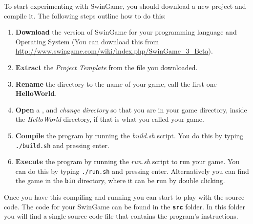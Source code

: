 To start experimenting with SwinGame, you should download a new project and compile it. The following steps outline how to do this:
\begin{enumerate}
  \item \textbf{Download} the version of SwinGame for your programming language and Operating System (You can download this from \url{http://www.swingame.com/wiki/index.php/SwinGame_3_Beta}). 
  \item \textbf{Extract} the \emph{Project Template} from the file you downloaded.
  \item \textbf{Rename} the directory to the name of your game, call the first one \textbf{HelloWorld}.
  \item \textbf{Open} a , and \emph{change directory} so that you are in your game directory, inside the \emph{HelloWorld} directory, if that is what you called your game.
  \item \textbf{Compile} the program by running the \emph{build.sh} script. You do this by typing \texttt{./build.sh} and pressing enter.
  \item \textbf{Execute} the program by running the \emph{run.sh} script to run your game. You can do this by typing \texttt{./run.sh} and pressing enter. Alternatively you can find the game in the \texttt{bin} directory, where it can be run by double clicking.
\end{enumerate}

Once you have this compiling and running you can start to play with the source code. The code for your SwinGame can be found in the \textbf{\texttt{src}} folder. In this folder you will find a single source code file that contains the program's instructions.


